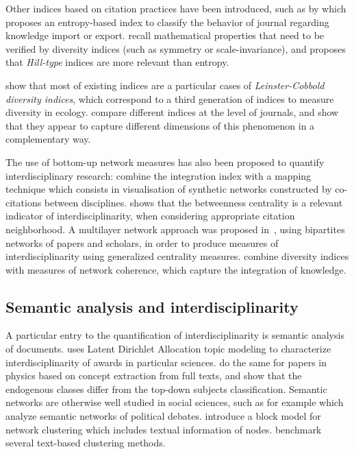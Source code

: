 Other indices based on citation practices have been introduced, such as by \cite{rodriguez2017disciplinarity} which proposes an entropy-based index to classify the behavior of journal regarding knowledge import or export. \cite{zhang2016diversity} recall mathematical properties that need to be verified by diversity indices (such as symmetry or scale-invariance), and proposes that \emph{Hill-type} indices are more relevant than entropy.

\cite{mugabushaka2016bibliometric} show that most of existing indices are a particular cases of \emph{Leinster-Cobbold diversity indices}, which correspond to a third generation of indices to measure diversity in ecology. \cite{leydesdorff2011indicators} compare different indices at the level of journals, and show that they appear to capture different dimensions of this phenomenon in a complementary way.


The use of bottom-up network measures has also been proposed to quantify interdisciplinary research: \cite{porter2009science} combine the integration index with a mapping technique which consists in visualisation of synthetic networks constructed by co-citations between disciplines. \cite{leydesdorff2007betweenness} shows that the betweenness centrality is a relevant indicator of interdisciplinarity, when considering appropriate citation neighborhood. A multilayer network approach was proposed in~\cite{omodei2017evaluating}, using bipartites networks of papers and scholars, in order to produce measures of interdisciplinarity using generalized centrality measures. \cite{rafols2009diversity} combine diversity indices with measures of network coherence, which capture the integration of knowledge.


\subsection*{Semantic analysis and interdisciplinarity}

A particular entry to the quantification of interdisciplinarity is semantic analysis of documents. \cite{nichols2014topic} uses Latent Dirichlet Allocation topic modeling to characterize interdisciplinarity of awards in particular sciences. \cite{palchykov2016ground} do the same for papers in physics based on concept extraction from full texts, and show that the endogenous classes differ from the top-down subjects classification. Semantic networks are otherwise well studied in social sciences, such as for example \cite{2015arXiv151003797G} which analyze semantic networks of political debates. \cite{bouveyron2016stochastic} introduce a block model for network clustering which includes textual information of nodes. \cite{10.1371/journal.pone.0018029} benchmark several text-based clustering methods.

